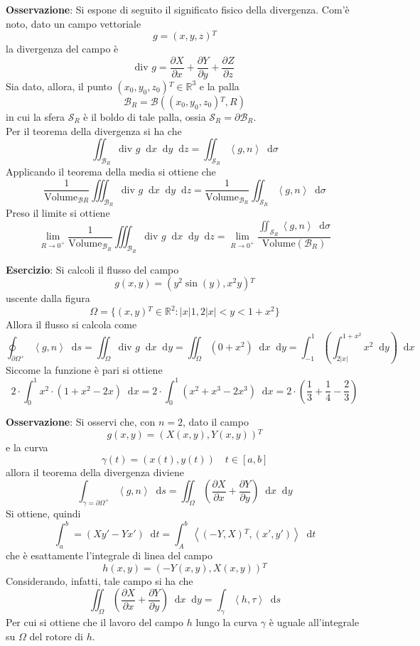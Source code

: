 \documentclass[a4paper]{extarticle}
\newcommand*\dif{\mathop{}\!\mathrm{d}}
\begin{document}
\vspace{2em}
\noindent
\textbf{Osservazione}: Si espone di seguito il significato fisico della divergenza. Com'è noto, dato un campo vettoriale
\[g=(x,y,z){^T}\]
la divergenza del campo è
\[\text{div } g = \dfrac{\partial X}{\partial x} + \dfrac{\partial Y}{\partial y} + \dfrac{\partial Z}{\partial z}\]
Sia dato, allora, il punto $(x_0,y_0,z_0){^T} \in \mathbb{R}^3$ e la palla
\[\mathcal{B}_R = \mathcal{B}\left((x_0,y_0,z_0){^T},R\right)\]
in cui la sfera $\mathcal{S}_R$ è il boldo di tale palla, ossia $\mathcal{S}_R = \partial \mathcal{B}_R$.\\
Per il teorema della divergenza si ha che
\[\iint_{\mathcal{B}_R} \text{div } g \dif x \dif y \dif z = \iint_{\mathcal{S}_R} \left<g,n\right> \dif \sigma\]
Applicando il teorema della media si ottiene che
\[\dfrac{1}{\text{Volume}_{\mathcal{B}R}} \iiint_{\mathcal{B}_R} \text{div } g \dif x \dif y \dif z = \dfrac{1}{\text{Volume}_{\mathcal{B}_R}} \iint_{\mathcal{S}_R} \left<g,n\right> \dif \sigma\]
Preso il limite si ottiene
\[\lim_{R \to 0^+} \dfrac{1}{\text{Volume}_{\mathcal{B}_R}} \iiint_{\mathcal{B}_R} \text{div } g \dif x \dif y \dif z = \lim_{R \to 0^+} \dfrac{\displaystyle{\iint_{\mathcal{S}_R}} \left<g,n\right> \dif \sigma}{\text{Volume}(\mathcal{B}_R)}\]

\vspace{2em}
\noindent
\textbf{Esercizio}: Si calcoli il flusso del campo
\[g(x,y)=\left(y^2 \sin(y), x^2y\right){^T}\]
uscente dalla figura
\[\Omega = \{(x,y){^T} \in \mathbb{R}^2 : \vert x \vert 1, 2 \vert x \vert < y < 1+x^2\}\]
Allora il flusso si calcola come
\[\oint_{\partial \Omega^+} \left<g,n\right> \dif s = \iint_{\Omega} \text{div }g \dif x \dif y = \iint_\Omega \left(0+x^2\right) \dif x \dif y = \int_{-1}^{1} \left(\int_{2\vert x\vert}^{1+x^2} x^2 \dif y\right) \dif x\]
Siccome la funzione è pari si ottiene
\[2 \cdot \int_0^1 x^2 \cdot (1+x^2-2x) \dif x = 2 \cdot \int_0^1 (x^2+x^3-2x^3) \dif x = 2 \cdot \left(\dfrac{1}{3}+\dfrac{1}{4}-\dfrac{2}{3}\right)\]

\vspace{2em}
\noindent
\textbf{Osservazione}: Si osservi che, con $n=2$, dato il campo
\[g(x,y)=\left(X(x,y),Y(x,y)\right){^T}\]
e la curva
\[\gamma(t)=\left(x(t),y(t)\right) \hspace{1em} t \in [a,b]\]
allora il teorema della divergenza diviene
\[\int_{\gamma=\partial \Omega^+} \left<g,n\right> \dif s = \iint_\Omega \left(\dfrac{\partial X}{\partial x} + \dfrac{\partial Y}{\partial y}\right) \dif x \dif y\]
Si ottiene, quindi
\[\int_a^b = \left(Xy'-Yx'\right) \dif t = \int_A^b \left<(-Y,X){^T},(x',y')\right> \dif t\]
che è esattamente l'integrale di linea del campo
\[h(x,y)=\left(-Y(x,y),X(x,y)\right){^T}\]
Considerando, infatti, tale campo si ha che
\[\iint_\Omega \left(\dfrac{\partial X}{\partial x} + \dfrac{\partial Y}{\partial y} \right) \dif x \dif y = \int_\gamma \left<h,\tau\right> \dif s\]
Per cui si ottiene che il lavoro del campo $h$ lungo la curva $\gamma$ è uguale all'integrale su $\Omega$ del rotore di $h$.
\end{document}
